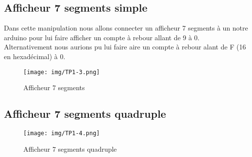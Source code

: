\subsection{Afficheur 7 segments simple}
Dans cette manipulation nous allons connecter un afficheur 7 segments à un notre arduino pour lui faire afficher un compte à rebour allant de 9 à 0. Alternativement nous aurions pu lui faire aire un compte à rebour alant de F (16 en hexadécimal) à 0.

\begin{figure}[H]
	\centering
	\texttt{[image: img/TP1-3.png]}
	\caption{\label{TP1.3}Afficheur 7 segments}
\end{figure}

\subsection{Afficheur 7 segments quadruple}

\begin{figure}[H]
	\centering
	\texttt{[image: img/TP1-4.png]}
	\caption{\label{TP1.4}Afficheur 7 segments quadruple}
\end{figure}

